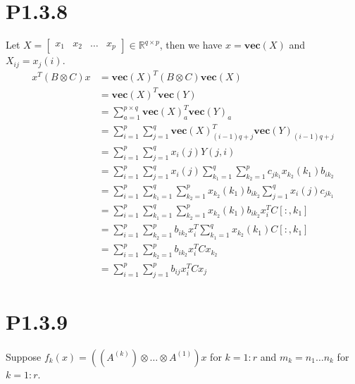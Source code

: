 \documentclass{article}
\newcommand{\vect}[1]{\textbf{vec}(#1)}
\begin{document}
\section*{P1.3.8}

Let $X=\begin{bmatrix} x_1 & x_2 & \dots & x_p \end{bmatrix} \in \mathbb{R}^{q\times p}$,
then we have $x=\vect{X}$ and $X_{ij}=x_{j}(i)$.
\begin{align*}
    x^T(B\otimes C)x & = \vect{X}^T(B\otimes C)\vect{X}                                                                \\
                     & = \vect{X}^T\vect{Y} \tag*{($Y=CXB^T$, 1.3.6)}                                                  \\
                     & = \sum_{a=1}^{p\times q} \vect{X}^T_a \vect{Y}_a                                                \\
                     & = \sum_{i=1}^p\sum_{j=1}^q \vect{X}^T_{(i-1)q+j} \vect{Y}_{(i-1)q+j}                            \\
                     & = \sum_{i=1}^p\sum_{j=1}^q x_i(j)Y(j,i)                                                         \\
                     & = \sum_{i=1}^p\sum_{j=1}^q x_i(j) \sum_{k_1=1}^q\sum_{k_2=1}^p c_{jk_1}x_{k_2}(k_1) b_{ik_2}    \\
                     & = \sum_{i=1}^p\sum_{k_1=1}^q\sum_{k_2=1}^p  x_{k_2}(k_1) b_{ik_2}  \sum_{j=1}^q x_i(j) c_{jk_1} \\
                     & =\sum_{i=1}^p\sum_{k_1=1}^q\sum_{k_2=1}^p  x_{k_2}(k_1) b_{ik_2} x_i^TC[:,k_1]                  \\
                     & = \sum_{i=1}^p\sum_{k_2=1}^p  b_{ik_2} x_i^T  \sum_{k_1=1}^q  x_{k_2}(k_1)C[:,k_1]              \\
                     & = \sum_{i=1}^p\sum_{k_2=1}^p  b_{ik_2} x_i^T C x_{k_2}                                          \\
                     & = \sum_{i=1}^p\sum_{j=1}^p  b_{ij} x_i^T C x_{j}
\end{align*}

\section*{P1.3.9}

Suppose $f_k(x) =((A^{(k)}) \otimes \dots \otimes A^{(1)})x$ for $k=1:r$ and $m_k=n_1\dots n_k$ for $k=1:r$.
\end{document}
